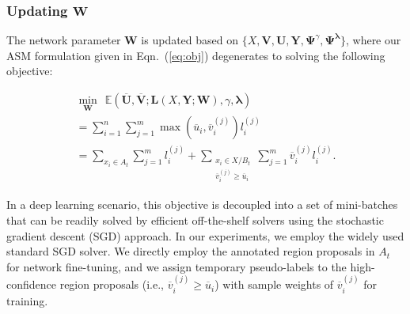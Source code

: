 \documentclass[journal]{IEEEtran}
\begin{document}
{\subsubsection{\textbf{Updating $\mathbf{W}$}}
The network parameter $\mathbf{W}$ is updated based on $\{X,\mathbf{V}, \mathbf{U}, \mathbf{Y}, \mathbf{\Psi}^{\gamma}, \mathbf{ \Psi}^{\bm \lambda}\}$, where our {ASM} formulation given in Eqn.~(\ref{eq:obj}) degenerates to solving the following objective:
  \begin{small}
	\begin{equation}
	\label{eq:finetune}
	\begin{gathered}
	\underset{ \mathbf{W}}{\min} \
	\  
	\mathbb{E}(\mathbf{\overline{U}},\mathbf{\overline{V}}; \mathbf{L}(X, \mathbf{Y}; \mathbf{W}), \gamma, {\bm \lambda}) \\
	= \sum_{i=1}^{n}\sum_{j=1}^{m}\max(\overline{u}_i,\overline{v}^{(j)}_i)l^{(j)}_i \\
	=\underset{x_i\in A_t}{\sum}\sum_{j=1}^{m}l^{(j)}_i+\underset{\substack{x_i\in X/B_t\\\overline{v}^{(j)}_i\geq\overline{u}_i}}{\sum}\sum_{j=1}^{m}\overline{v}^{(j)}_il^{(j)}_i.
	\end{gathered}
	\end{equation}\end{small}In a deep learning scenario, this objective is decoupled into a set of mini-batches that can be readily solved by {efficient off-the-shelf} solvers using the stochastic gradient descent (SGD) approach. In our experiments, we employ the widely used standard SGD solver. We directly employ the annotated region proposals in $A_t$ for network fine-tuning, and we assign {temporary pseudo-labels} to the high-confidence region proposals (i.e., $\overline{v}^{(j)}_i\geq\overline{u}_i$) with sample weights of $\overline{v}^{(j)}_i$ for training.

}
\end{document}
